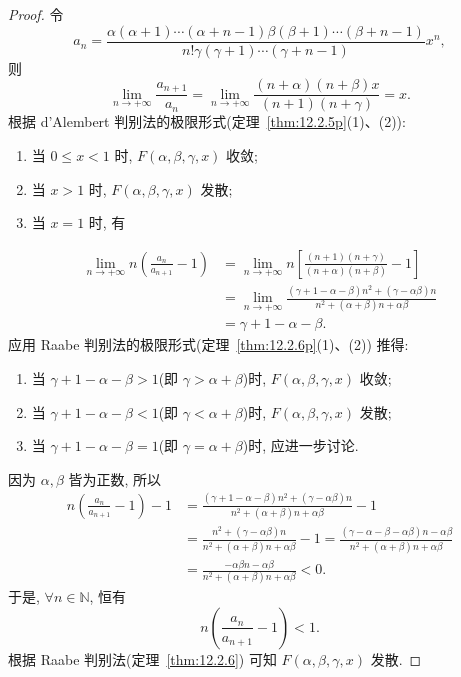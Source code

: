 \begin{proof}
令
\[
  a_{n}=\frac{\alpha(\alpha+1)\cdots(\alpha+n-1)\beta(\beta+1)\cdots(\beta+n-1)}
             {n!\gamma(\gamma+1)\cdots(\gamma+n-1)}x^{n},
\]
则
\[
  \lim_{n\to+\infty}\frac{a_{n+1}}{a_{n}}
  =\lim_{n\to+\infty}\frac{(n+\alpha)(n+\beta)x}{(n+1)(n+\gamma)}=x.
\]
根据 d'Alembert 判别法的极限形式(定理~\ref{thm:12.2.5p}(1)、(2)):
\begin{enumerate}
  \item[(1)] 当 $0\leqslant x<1$ 时, $F(\alpha,\beta,\gamma,x)$ 收敛;
  \item[(2)] 当 $x>1$ 时, $F(\alpha,\beta,\gamma,x)$ 发散;
  \item[(3)] 当 $x=1$ 时, 有
\end{enumerate}
\begin{align*}
  \lim_{n\to+\infty}n\left(\frac{a_{n}}{a_{n+1}}-1\right)
  &=\lim_{n\to+\infty}n\left[\frac{(n+1)(n+\gamma)}{(n+\alpha)(n+\beta)}-1\right] \\
  &=\lim_{n\to+\infty}
   \frac{(\gamma+1-\alpha-\beta)n^{2}+(\gamma-\alpha\beta)n}
        {n^{2}+(\alpha+\beta)n+\alpha\beta} \\
  &=\gamma+1-\alpha-\beta.
\end{align*}
应用 Raabe 判别法的极限形式(定理~\ref{thm:12.2.6p}(1)、(2)) 推得:
\begin{enumerate}
  \item[①] 当 $\gamma+1-\alpha-\beta>1$(即 $\gamma>\alpha+\beta$)时, $F(\alpha,\beta,\gamma,x)$ 收敛;
  \item[②] 当 $\gamma+1-\alpha-\beta<1$(即 $\gamma<\alpha+\beta$)时, $F(\alpha,\beta,\gamma,x)$ 发散;
  \item[③] 当 $\gamma+1-\alpha-\beta=1$(即 $\gamma=\alpha+\beta$)时, 应进一步讨论.
\end{enumerate}

因为 $\alpha,\beta$ 皆为正数, 所以
\begin{align*}
  n\left(\frac{a_{n}}{a_{n+1}}-1\right)-1
  &=\frac{(\gamma+1-\alpha-\beta)n^{2}+(\gamma-\alpha\beta)n}{n^{2}+(\alpha+\beta)n+\alpha\beta}-1 \\
  &=\frac{n^{2}+(\gamma-\alpha\beta)n}{n^{2}+(\alpha+\beta)n+\alpha\beta}-1
   =\frac{(\gamma-\alpha-\beta-\alpha\beta)n-\alpha\beta}{n^{2}+(\alpha+\beta)n+\alpha\beta} \\
  &=\frac{-\alpha\beta n-\alpha\beta}{n^{2}+(\alpha+\beta)n+\alpha\beta}<0.
\end{align*}
于是, $\forall n\in\mathbb{N}$, 恒有
\[
  n\left(\frac{a_{n}}{a_{n+1}}-1\right)<1.
\]
根据 Raabe 判别法(定理~\ref{thm:12.2.6}) 可知 $F(\alpha,\beta,\gamma,x)$ 发散.


\end{proof}
